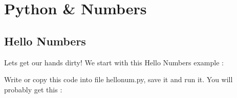 
\chapter{Python \& Numbers}

\section{Hello Numbers}

Lets get our hands dirty! We start with this {\color{cyan} Hello Numbers} example :


Write or copy this code into file {\color{magenta} hellonum.py,}  save it and run it. You will probably get this :

